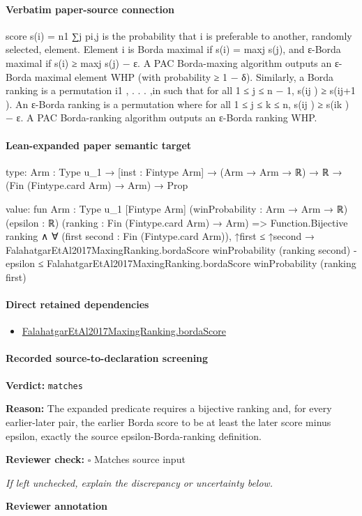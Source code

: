 \documentclass[10pt]{article}
\newcommand{\reviewerbox}{%
  \par\noindent\fbox{\parbox{0.96\linewidth}{\rule{0pt}{0.38in}}}\par
}
\newcommand{\reviewmatch}[1]{%
  \par\noindent\textbf{Reviewer check:} $\square$\; #1\par
  \noindent\emph{If left unchecked, explain the discrepancy or uncertainty below.}\par
}
\begin{document}
\paragraph{Verbatim paper-source connection}
\begin{ReviewVerbatim}
score s(i) = n1 ∑j pi,j is the probability that i is preferable to another, randomly selected, element.
Element i is Borda maximal if s(i) = maxj s(j), and ε-Borda maximal if s(i) ≥ maxj s(j) − ε. A
PAC Borda-maxing algorithm outputs an ε-Borda maximal element WHP (with probability ≥ 1 − δ).
Similarly, a Borda ranking is a permutation i1 , . . . ,in such that for all 1 ≤ j ≤ n − 1, s(ij ) ≥ s(ij+1 ).
An ε-Borda ranking is a permutation where for all 1 ≤ j ≤ k ≤ n, s(ij ) ≥ s(ik ) − ε. A PAC
Borda-ranking algorithm outputs an ε-Borda ranking WHP.
\end{ReviewVerbatim}



\paragraph{Lean-expanded paper semantic target}
\begin{ReviewVerbatim}
type:
{Arm : Type u_1} → [inst : Fintype Arm] → (Arm → Arm → ℝ) → ℝ → (Fin (Fintype.card Arm) → Arm) → Prop

value:
fun {Arm : Type u_1} [Fintype Arm] (winProbability : Arm → Arm → ℝ) (epsilon : ℝ)
    (ranking : Fin (Fintype.card Arm) → Arm) =>
  Function.Bijective ranking ∧
    ∀ (first second : Fin (Fintype.card Arm)),
      ↑first ≤ ↑second →
        FalahatgarEtAl2017MaxingRanking.bordaScore winProbability (ranking second) - epsilon ≤
          FalahatgarEtAl2017MaxingRanking.bordaScore winProbability (ranking first)
\end{ReviewVerbatim}

\paragraph{Direct retained dependencies}
\begin{itemize}\raggedright
\item \hyperlink{paper-prerequisite-671eb60c445d7522}{Falahatgar\allowbreak{}Et\allowbreak{}Al2017\allowbreak{}Maxing\allowbreak{}Ranking.\allowbreak{}borda\allowbreak{}Score}
\end{itemize}
\paragraph{Recorded source-to-declaration screening}
\textbf{Verdict:} \texttt{matches}
\\
{\raggedright
\textbf{Reason:} The expanded predicate requires a bijective ranking and, for every earlier-\allowbreak{}later pair, the earlier Borda score to be at least the later score minus epsilon, exactly the source epsilon-\allowbreak{}Borda-\allowbreak{}ranking definition.\allowbreak{}
\par}
\reviewmatch{Matches source input}
\noindent\textbf{Reviewer annotation}\par
\reviewerbox
\clearpage
\hypertarget{paper-prerequisite-f40acf814741691d}{}
\end{document}
